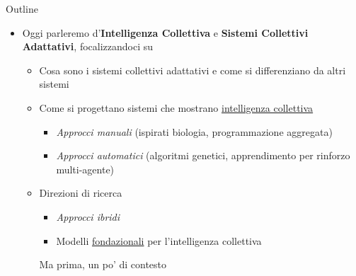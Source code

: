 \documentclass[presentation, 10pt,aspectratio=169]{beamer}\mode<presentation>{\usetheme{AMSBolognaFC}}
\begin{document}
\begin{frame}{Outline}
	\begin{itemize}
		\item Oggi parleremo d'\alert{\textbf{Intelligenza Collettiva}} e \alert{\textbf{Sistemi Collettivi Adattativi}}, focalizzandoci su
		\begin{itemize}
			\item Cosa sono i sistemi collettivi adattativi e come si differenziano da altri sistemi
			\item Come si progettano sistemi che mostrano \underline{intelligenza collettiva}
			\begin{itemize}
				\item \emph{Approcci manuali} (ispirati biologia, programmazione aggregata)
				\item \emph{Approcci automatici} (algoritmi genetici, apprendimento per rinforzo multi-agente)
			\end{itemize}
			\item Direzioni di ricerca
			\begin{itemize}
				\item \emph{Approcci ibridi}
				\item Modelli \underline{fondazionali} per l'intelligenza collettiva
			\end{itemize}
			Ma prima, un po' di contesto \alert{\faSmileO}
		\end{itemize}
	\end{itemize}
\end{frame}
\end{document}
